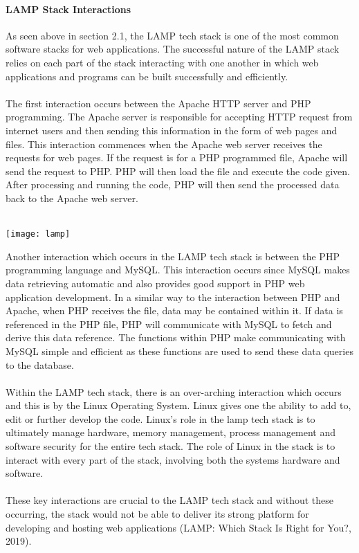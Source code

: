 \documentclass[a4paper, 11pt]{report}
\begin{document}
	\paragraph{LAMP Stack Interactions} As seen above in section 2.1, the LAMP tech stack is one of the most common software stacks for web applications. The successful nature of the LAMP stack relies on each part of the stack interacting with one another in which web applications and programs can be built successfully and efficiently. 
	\\
	\\
	\noindent
	The first interaction occurs between the Apache HTTP server and PHP programming. The Apache server is responsible for accepting HTTP request from internet users and then sending this information in the form of web pages and files. This interaction commences when the Apache web server receives the requests for web pages. If the request is for a PHP programmed file, Apache will send the request to PHP. PHP will then load the file and execute the code given. After processing and running the code, PHP will then send the processed data back to the Apache web server.
	\\
	\\
	\begin{center}
    \texttt{[image: lamp]}
    \end{center}
	\noindent
	Another interaction which occurs in the LAMP tech stack is between the PHP programming language and MySQL. This interaction occurs since MySQL makes data retrieving automatic and also provides good support in PHP web application development. In a similar way to the interaction between PHP and Apache, when PHP receives the file, data may be contained within it. If data is referenced in the PHP file, PHP will communicate with MySQL to fetch and derive this data reference. The functions within PHP make communicating with MySQL simple and efficient as these functions are used to send these data queries to the database.
	\\
	\\
	Within the LAMP tech stack, there is an over-arching interaction which occurs and this is by the Linux Operating System. Linux gives one the ability to add to, edit or further develop the code. Linux’s role in the lamp tech stack is to ultimately manage hardware, memory management, process management and software security for the entire tech stack. The role of Linux in the stack is to interact with every part of the stack, involving both the systems hardware and software.
	\\
	\\
	These key interactions are crucial to the LAMP tech stack and without these occurring, the stack would not be able to deliver its strong platform for developing and hosting web applications (LAMP: Which Stack Is Right for You?, 2019).
	\\
	
\end{document}
